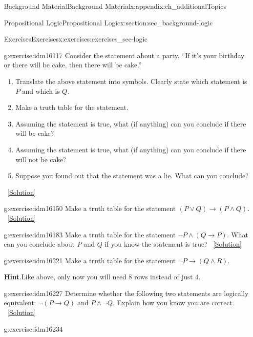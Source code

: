 \documentclass[oneside,10pt,]{book}
\numberwithin{equation}{chapter}
\def\imp{\rightarrow}
\begin{document}
\begin{appendixptx}{Background Material}{}{Background Material}{}{}{x:appendix:ch_additionalTopics}
\begin{sectionptx}{Propositional Logic}{}{Propositional Logic}{}{}{x:section:sec_background-logic}
\begin{exercises-subsection}{Exercises}{}{Exercises}{}{}{x:exercises:exercises_sec-logic}
\begin{divisionexercise}{1}{}{}{g:exercise:idm16117}
Consider the statement about a party, ``If it's your birthday or there will be cake, then there will be cake.''%
\par
%
\begin{enumerate}[label=(\alph*)]
\item{}Translate the above statement into symbols. Clearly state which statement is \(P\) and which is \(Q\).%
\item{}Make a truth table for the statement.%
\item{}Assuming the statement is true, what (if anything) can you conclude if there will be cake?%
\item{}Assuming the statement is true, what (if anything) can you conclude if there will not be cake?%
\item{}Suppose you found out that the statement was a lie. What can you conclude?%
\end{enumerate}
%
\qquad~\hfill{\tiny\hyperlink{g:solution:idm16135-main}{[Solution]}}\end{divisionexercise}%
\begin{divisionexercise}{2}{}{}{g:exercise:idm16150}%
Make a truth table for the statement \((P \vee Q) \imp (P \wedge Q)\).%
\qquad~\hfill{\tiny\hyperlink{g:solution:idm16154-main}{[Solution]}}\end{divisionexercise}%
\begin{divisionexercise}{3}{}{}{g:exercise:idm16183}%
Make a truth table for the statement \(\neg P \wedge (Q \imp P)\). What can you conclude about \(P\) and \(Q\) if you know the statement is true?%
\qquad~\hfill{\tiny\hyperlink{g:solution:idm16189-main}{[Solution]}}\end{divisionexercise}%
\begin{divisionexercise}{4}{}{}{g:exercise:idm16221}%
Make a truth table for the statement \(\neg P \imp (Q \wedge R)\).%
\par\smallskip%
\noindent\textbf{Hint}.\hypertarget{g:hint:idm16225}{}\quad{}Like above, only now you will need 8 rows instead of just 4.%
\end{divisionexercise}%
\begin{divisionexercise}{5}{}{}{g:exercise:idm16227}%
Determine whether the following two statements are logically equivalent:  \(\neg(P \imp Q)\) and \(P \wedge \neg Q\). Explain how you know you are correct.%
\qquad~\hfill{\tiny\hyperlink{g:solution:idm16232-main}{[Solution]}}\end{divisionexercise}%
\begin{divisionexercise}{6}{}{}{g:exercise:idm16234}%

\end{divisionexercise}
\end{exercises-subsection}
\end{sectionptx}
\end{appendixptx}
\end{document}
